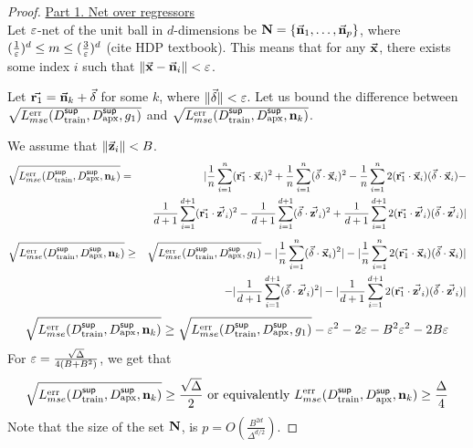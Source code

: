 \begin{proof}
\underline{Part 1. Net over regressors} \\
Let ${\varepsilon}$-net of the unit ball in $d$-dimensions be  ${\mathbf{N}} =\{\vec{{\mathbf{n}}}_1,\dots,\vec{{\mathbf{n}}}_p\}$, where $(\frac{1}{{\varepsilon}})^d\leq m \leq(\frac{3}{{\varepsilon}})^d$ (cite HDP textbook). This means that for any $\vec{{\mathbf{x}}}$, there exists some index $i$ such that $\|\vec{{\mathbf{x}}} -  \vec{{\mathbf{n}}}_i\| < {\varepsilon}$.

Let $\vec{{\mathbf{r}}_1} = \vec{{\mathbf{n}}}_k + \vec{\delta}$ for some $k$, where $\|\vec{\delta}\| < {\varepsilon}$. Let us bound the difference between $\sqrt{L^{\textnormal{err}}_{mse}(D^{\sf sup}_{\textnormal{train}}, D^{\sf sup}_{\textnormal{apx}}, g_1)}$ and $\sqrt{L^{\textnormal{err}}_{mse}(D^{\sf sup}_{\textnormal{train}}, D^{\sf sup}_{\textnormal{apx}}, {\mathbf{n}}_k)}$. 

We assume that $\|\vec{{\mathbf{z}}}_i\| <B$.
\begin{eqnarray}
    \sqrt{L^{\textnormal{err}}_{mse}(D^{\sf sup}_{\textnormal{train}}, D^{\sf sup}_{\textnormal{apx}}, {\mathbf{n}}_k)} &=& |\frac{1}{n}\sum_{i=1}^{n} (\vec{{\mathbf{r}}_1}\cdot\vec{{\mathbf{x}}}_i)^2 + \frac{1}{n}\sum_{i=1}^{n}(\vec{\delta}\cdot\vec{{\mathbf{x}}}_i)^2 -\frac{1}{n}\sum_{i=1}^{n}2(\vec{{\mathbf{r}}_1}\cdot\vec{{\mathbf{x}}}_i)(\vec{\delta}\cdot\vec{{\mathbf{x}}}_i) - \nonumber \\ 
        && \quad\frac{1}{d+1}\sum_{i=1}^{d+1} (\vec{{\mathbf{r}}_1}\cdot\vec{{\mathbf{z}}'}_i)^2 -\frac{1}{d+1}\sum_{i=1}^{d+1}(\vec{\delta}\cdot\vec{{\mathbf{z}}'}_i)^2 +\frac{1}{d+1}\sum_{i=1}^{d+1}2(\vec{{\mathbf{r}}_1}\cdot\vec{{\mathbf{z}}'}_i)(\vec{\delta}\cdot\vec{{\mathbf{z}}'}_i)|\nonumber
\end{eqnarray}
\begin{eqnarray}
    \sqrt{L^{\textnormal{err}}_{mse}(D^{\sf sup}_{\textnormal{train}}, D^{\sf sup}_{\textnormal{apx}}, {\mathbf{n}}_k)} &\geq& \sqrt{L^{\textnormal{err}}_{mse}(D^{\sf sup}_{\textnormal{train}}, D^{\sf sup}_{\textnormal{apx}}, g_1)} -|\frac{1}{n} \sum_{i=1}^{n}(\vec{\delta}\cdot\vec{{\mathbf{x}}}_i)^2| -|\frac{1}{n}\sum_{i=1}^{n}2(\vec{{\mathbf{r}}_1}\cdot\vec{{\mathbf{x}}}_i)(\vec{\delta}\cdot\vec{{\mathbf{x}}}_i)| \nonumber \\ 
        && \quad-|\frac{1}{d+1}\sum_{i=1}^{d+1}(\vec{\delta}\cdot\vec{{\mathbf{z}}'}_i)^2| -|\frac{1}{d+1}\sum_{i=1}^{d+1}2(\vec{{\mathbf{r}}_1}\cdot\vec{{\mathbf{z}}'}_i)(\vec{\delta}\cdot\vec{{\mathbf{z}}'}_i)|\nonumber
\end{eqnarray}
\[
    \sqrt{L^{\textnormal{err}}_{mse}(D^{\sf sup}_{\textnormal{train}}, D^{\sf sup}_{\textnormal{apx}}, {\mathbf{n}}_k)} \geq \sqrt{L^{\textnormal{err}}_{mse}(D^{\sf sup}_{\textnormal{train}}, D^{\sf sup}_{\textnormal{apx}}, g_1)} - {\varepsilon}^2 - 2{\varepsilon} -B^2{\varepsilon}^2 - 2B{\varepsilon}
\]
For ${\varepsilon} = \frac{\sqrt{\Delta}}{4(B+B^2)}$, we get that
\[
    \sqrt{L^{\textnormal{err}}_{mse}(D^{\sf sup}_{\textnormal{train}}, D^{\sf sup}_{\textnormal{apx}}, {\mathbf{n}}_k)} \geq \frac{\sqrt{\Delta}}{2} \text{ or equivalently }{{L^{\ensuremath{\textnormal{err}}}_{mse}(D^{\sf sup}_{\ensuremath{\textnormal{train}}}, D^{\sf sup}_{\ensuremath{\textnormal{apx}}}, {\mathbf{n}}_k)}} \geq \frac{{\Delta}}{4}
\]
Note that the size of the set ${\mathbf{N}}$, is $p = O(\frac{B^{2d}}{\Delta^{d/2}})$.


\end{proof}
